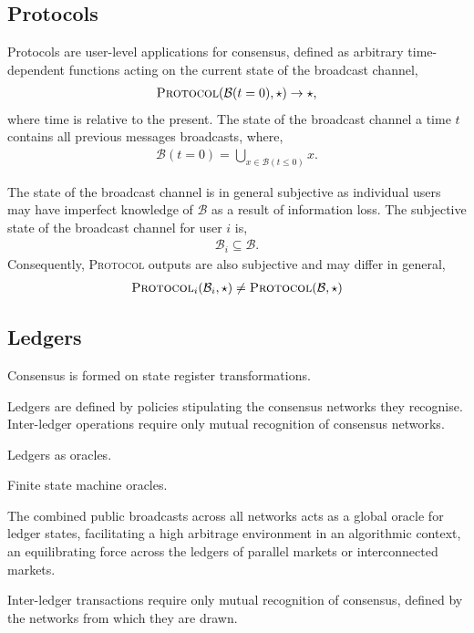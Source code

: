 
\subsection{Protocols}

Protocols are user-level applications for consensus, defined as arbitrary time-dependent functions acting on the current state of the broadcast channel,
\begin{align}
	\textsc{Protocol}(\mathcal{B}(t=0),\star)\to \star,
\end{align}
where time is relative to the present. The state of the broadcast channel a time $t$ contains all previous messages broadcasts,
where,
\begin{align}
	\mathcal{B}(t=0) = \bigcup_{x\in \mathcal{B}(t\leq 0)} x.
\end{align}

The state of the broadcast channel is in general subjective as individual users may have imperfect knowledge of $\mathcal{B}$ as a result of information loss. The subjective state of the broadcast channel for user $i$ is,
\begin{align}
	\mathcal{B}_i \subseteq \mathcal{B}.
\end{align}
Consequently, \textsc{Protocol} outputs are also subjective and may differ in general,
\begin{align}
	\textsc{Protocol}_i(\mathcal{B}_i,\star) \neq \textsc{Protocol}(\mathcal{B},\star)
\end{align}

\subsection{Ledgers}

Consensus is formed on state register transformations.

Ledgers are defined by policies stipulating the consensus networks they recognise. Inter-ledger operations require only mutual recognition of consensus networks.

Ledgers as oracles.

Finite state machine oracles.

The combined public broadcasts across all networks acts as a global oracle for ledger states, facilitating a high arbitrage environment in an algorithmic context, an equilibrating force across the ledgers of parallel markets or interconnected markets.

Inter-ledger transactions require only mutual recognition of consensus, defined by the networks from which they are drawn.

